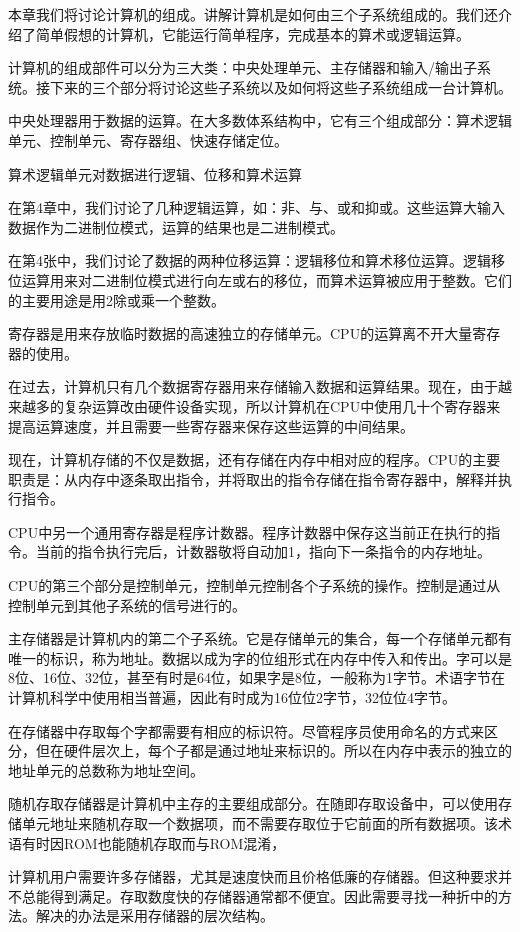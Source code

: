 
本章我们将讨论计算机的组成。讲解计算机是如何由三个子系统组成的。我们还介绍了简单假想的计算机，它能运行简单程序，完成基本的算术或逻辑运算。

计算机的组成部件可以分为三大类：中央处理单元、主存储器和输入/输出子系统。接下来的三个部分将讨论这些子系统以及如何将这些子系统组成一台计算机。

中央处理器用于数据的运算。在大多数体系结构中，它有三个组成部分：算术逻辑单元、控制单元、寄存器组、快速存储定位。

算术逻辑单元对数据进行逻辑、位移和算术运算

在第4章中，我们讨论了几种逻辑运算，如：非、与、或和抑或。这些运算大输入数据作为二进制位模式，运算的结果也是二进制模式。

在第4张中，我们讨论了数据的两种位移运算：逻辑移位和算术移位运算。逻辑移位运算用来对二进制位模式进行向左或右的移位，而算术运算被应用于整数。它们的主要用途是用2除或乘一个整数。

寄存器是用来存放临时数据的高速独立的存储单元。CPU的运算离不开大量寄存器的使用。

在过去，计算机只有几个数据寄存器用来存储输入数据和运算结果。现在，由于越来越多的复杂运算改由硬件设备实现，所以计算机在CPU中使用几十个寄存器来提高运算速度，并且需要一些寄存器来保存这些运算的中间结果。

现在，计算机存储的不仅是数据，还有存储在内存中相对应的程序。CPU的主要职责是：从内存中逐条取出指令，并将取出的指令存储在指令寄存器中，解释并执行指令。

CPU中另一个通用寄存器是程序计数器。程序计数器中保存这当前正在执行的指令。当前的指令执行完后，计数器敬将自动加1，指向下一条指令的内存地址。

CPU的第三个部分是控制单元，控制单元控制各个子系统的操作。控制是通过从控制单元到其他子系统的信号进行的。

主存储器是计算机内的第二个子系统。它是存储单元的集合，每一个存储单元都有唯一的标识，称为地址。数据以成为字的位组形式在内存中传入和传出。字可以是8位、16位、32位，甚至有时是64位，如果字是8位，一般称为1字节。术语字节在计算机科学中使用相当普遍，因此有时成为16位位2字节，32位位4字节。

在存储器中存取每个字都需要有相应的标识符。尽管程序员使用命名的方式来区分，但在硬件层次上，每个子都是通过地址来标识的。所以在内存中表示的独立的地址单元的总数称为地址空间。

随机存取存储器是计算机中主存的主要组成部分。在随即存取设备中，可以使用存储单元地址来随机存取一个数据项，而不需要存取位于它前面的所有数据项。该术语有时因ROM也能随机存取而与ROM混淆，

计算机用户需要许多存储器，尤其是速度快而且价格低廉的存储器。但这种要求并不总能得到满足。存取数度快的存储器通常都不便宜。因此需要寻找一种折中的方法。解决的办法是采用存储器的层次结构。
